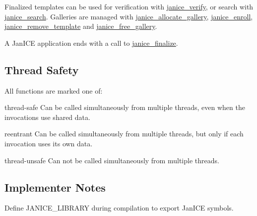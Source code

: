 Finalized templates can be used for verification with \hyperlink{group__janice_gafdbbe1f5e6346e5e84be26192e4561ac}{janice\+\_\+verify}, or search with \hyperlink{group__janice_ga073aa5f2133223c0b31ac3e78671836a}{janice\+\_\+search}. Galleries are managed with \hyperlink{group__janice_gad17bd59e58177b5f29f32f418ce77f71}{janice\+\_\+allocate\+\_\+gallery}, \hyperlink{group__janice_gae853da58f37454ddc14316da24543565}{janice\+\_\+enroll}, \hyperlink{group__janice_gaf84120b70a7b932ee02ca2f3b131ee54}{janice\+\_\+remove\+\_\+template} and \hyperlink{group__janice_gad059b35e049028060025889a14fe6982}{janice\+\_\+free\+\_\+gallery}.

A Jan\+I\+C\+E application ends with a call to \hyperlink{group__janice_ga3a2f0366f897c1168639b152b2cdf554}{janice\+\_\+finalize}.\hypertarget{group__janice_thread_safety}{}\subsection{Thread Safety}\label{group__janice_thread_safety}
All functions are marked one of\+:
\begin{DoxyItemize}
\item \label{group__janice_thread_safe}%
\hypertarget{group__janice_thread_safe}{}%
\begin{DoxyParagraph}{thread-\/safe}
Can be called simultaneously from multiple threads, even when the invocations use shared data.
\end{DoxyParagraph}

\item \label{group__janice_reentrant}%
\hypertarget{group__janice_reentrant}{}%
\begin{DoxyParagraph}{reentrant}
Can be called simultaneously from multiple threads, but only if each invocation uses its own data.
\end{DoxyParagraph}

\item \label{group__janice_thread_unsafe}%
\hypertarget{group__janice_thread_unsafe}{}%
\begin{DoxyParagraph}{thread-\/unsafe}
Can not be called simultaneously from multiple threads.
\end{DoxyParagraph}

\end{DoxyItemize}\hypertarget{group__janice_implementer_notes}{}\subsection{Implementer Notes}\label{group__janice_implementer_notes}
Define {\ttfamily J\+A\+N\+I\+C\+E\+\_\+\+L\+I\+B\+R\+A\+R\+Y} during compilation to export Jan\+I\+C\+E symbols. 

